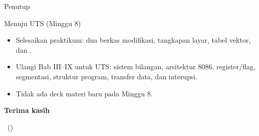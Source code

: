 \documentclass[aspectratio=169,11pt]{beamer}
\begin{document}
\begin{frame}{Penutup}
\begin{block}{Menuju UTS (Minggu 8)}
\small
\begin{itemize}
    \item Selesaikan praktikum: dua berkas  modifikasi,
          tangkapan layar, tabel vektor, dan .
    \item Ulangi Bab III--IX untuk UTS: sistem bilangan, arsitektur
          8086, register/flag, segmentasi, struktur program,
          transfer data, dan interupsi.
    \item Tidak ada deck materi baru pada Minggu 8.
\end{itemize}
\end{block}

\vspace{0.4em}
\begin{center}
{\color{obeBlue}\sffamily\large\bfseries Terima kasih\par}
\vspace{0.15em}
{\color{obeGray}\sffamily\small \NamaMK\ (\KodeMK)
\textbullet\ \SemesterTeks\par}
\end{center}
\end{frame}
\end{document}
